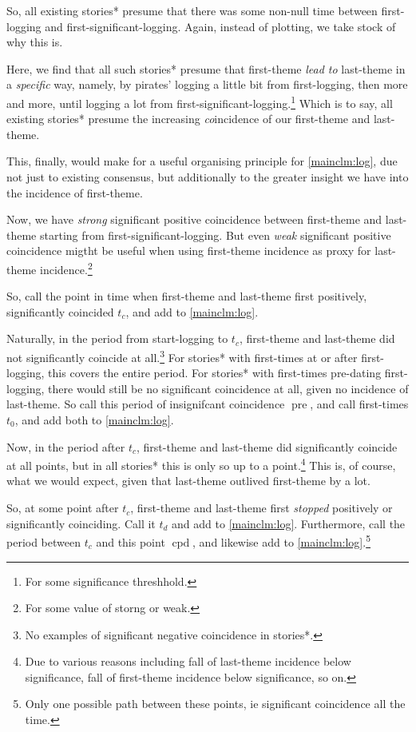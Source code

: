 \documentclass{amsart}
\DeclareMathOperator{\pre}{pre}%
\DeclareMathOperator{\cpd}{cpd}%
\theoremstyle{definition}
\theoremstyle{remark}
\begin{document}
			So, all existing stories* presume that there was some non-null time between first-logging and first-significant-logging. Again, instead of plotting, we take stock of why this is.
			
			Here, we find that all such stories* presume that first-theme \emph{lead to} last-theme in a \emph{specific} way, namely, by pirates' logging a little bit from first-logging, then more and more, until logging a lot from first-significant-logging.\footnote{For some significance threshhold.} Which is to say, all existing stories* presume the increasing \emph{co}incidence of our first-theme and last-theme.
			
			This, finally, would make for a useful organising principle for \ref{mainclm:log}, due not just to existing consensus, but additionally to the greater insight we have into the incidence of first-theme.
			
			Now, we have \emph{strong} significant positive coincidence between first-theme and last-theme starting from first-significant-logging. But even \emph{weak} significant positive coincidence migtht be useful when using first-theme incidence as proxy for last-theme incidence.\footnote{For some value of storng or weak.}
			
			So, call the point in time when first-theme and last-theme first positively, significantly coincided \(t_{c}\), and add to \ref{mainclm:log}.
			
			Naturally, in the period from start-logging to \(t_{c}\), first-theme and last-theme did not significantly coincide at all.\footnote{No examples of significant negative coincidence in stories*.} For stories* with first-times at or after first-logging, this covers the entire period. For stories* with first-times pre-dating first-logging, there would still be no significant coincidence at all, given no incidence of last-theme. So call this period of insignifcant coincidence \(\pre\), and call first-times \(t_{0}\), and add both to \ref{mainclm:log}.
			
			Now, in the period after \(t_{c}\), first-theme and last-theme did significantly coincide at all points, but in all stories* this is only so up to a point.\footnote{Due to various reasons including fall of last-theme incidence below significance, fall of first-theme incidence below significance, so on.} This is, of course, what we would expect, given that last-theme outlived first-theme by a lot.
			
			So, at some point after \(t_{c}\), first-theme and last-theme first \emph{stopped} positively or significantly coinciding. Call it \(t_{d}\) and add to \ref{mainclm:log}. Furthermore, call the period between \(t_{c}\) and this point \(\cpd\), and likewise add to \ref{mainclm:log}.\footnote{Only one possible path between these points, ie significant coincidence all the time.}
			
\end{document}
